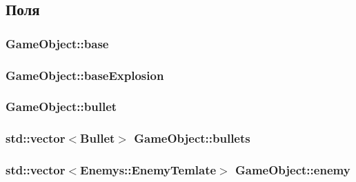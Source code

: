 \subsection{Поля}
\subsubsection[{\texorpdfstring{base}{base}}]{ Game\+Object\+::base}\hypertarget{classGameObject_a0d441ea1c04535a1bcfcf0dacd3e46b6}{}\label{classGameObject_a0d441ea1c04535a1bcfcf0dacd3e46b6}
\subsubsection[{\texorpdfstring{base\+Explosion}{baseExplosion}}]{ Game\+Object\+::base\+Explosion}\hypertarget{classGameObject_a03d9b8baaf2b58f0074fe183f4843379}{}\label{classGameObject_a03d9b8baaf2b58f0074fe183f4843379}
\subsubsection[{\texorpdfstring{bullet}{bullet}}]{ Game\+Object\+::bullet}\hypertarget{classGameObject_abfec990ef1d0b3124c838ee9b6357948}{}\label{classGameObject_abfec990ef1d0b3124c838ee9b6357948}
\subsubsection[{\texorpdfstring{bullets}{bullets}}]{\setlength{\rightskip}{0pt plus 5cm}std\+::vector$<${\bf Bullet}$>$ Game\+Object\+::bullets}\hypertarget{classGameObject_a6c4f71551f2ab511cca56814f3678a11}{}\label{classGameObject_a6c4f71551f2ab511cca56814f3678a11}
\subsubsection[{\texorpdfstring{enemy}{enemy}}]{\setlength{\rightskip}{0pt plus 5cm}std\+::vector$<${\bf Enemys\+::\+Enemy\+Temlate}$>$ Game\+Object\+::enemy}\hypertarget{classGameObject_a9ef32e6a46460a1db1d6005eb8a12cdd}{}\label{classGameObject_a9ef32e6a46460a1db1d6005eb8a12cdd}
